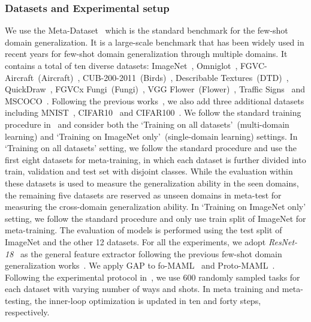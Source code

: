 \subsubsection{Datasets and Experimental setup}
We use the Meta-Dataset~\cite{triantafillou2019meta} which is the standard benchmark for the few-shot domain generalization. It is a large-scale benchmark that has been widely used in recent years for few-shot domain generalization through multiple domains. It contains a total of ten diverse datasets: ImageNet~\cite{russakovsky2015imagenet}, Omniglot~\cite{lake2015human}, FGVC-Aircraft~(Aircraft)~\cite{maji2013fine}, CUB-200-2011~(Birds)~\cite{wah2011caltech}, Describable Textures~(DTD)~\cite{cimpoi2014describing}, QuickDraw~\cite{jongejan2016quick}, FGVCx Fungi~(Fungi)~\cite{schroeder2018fgvcx}, VGG Flower~(Flower)~\cite{nilsback2008automated}, Traffic Signs~\cite{houben2013detection} and MSCOCO~\cite{lin2014microsoft}.
Following the previous works~\cite{requeima2019fast, bateni2020improved, li2021universal, triantafillou2021learning, li2022cross}, we also add three additional datasets including MNIST~\cite{lecun1998gradient}, CIFAR10~\cite{krizhevsky2009learning} and CIFAR100~\cite{krizhevsky2009learning}.
We follow the standard training procedure in~\cite{triantafillou2019meta} and consider both the `Training on all datasets'~(multi-domain learning) and `Training on ImageNet only'~(single-domain learning) settings. 
In ‘Training on all datasets’ setting, we follow the standard procedure and use the first eight datasets for meta-training, in which each dataset is further divided into train, validation and test set with disjoint classes.
While the evaluation within these datasets is used to measure the generalization ability in the seen domains, the remaining five datasets are reserved as unseen domains in meta-test for measuring the cross-domain generalization ability. In `Training on ImageNet only' setting, we follow the standard procedure and only use train split of ImageNet for meta-training. The evaluation of models is performed using the test split of ImageNet and the other 12 datasets. For all the experiments, we adopt \textit{ResNet-18}~\cite{he2016deep} as the general feature extractor following the previous few-shot domain generalization works~\cite{requeima2019fast, bateni2020improved, li2021universal, triantafillou2021learning, li2022cross}. We apply GAP to fo-MAML~\cite{finn2017model} and Proto-MAML~\cite{triantafillou2019meta}. Following the experimental protocol in~\cite{triantafillou2019meta}, we use 600 randomly sampled tasks for each dataset with varying number of ways and shots. In meta training and meta-testing, the inner-loop optimization is updated in ten and forty steps, respectively.

